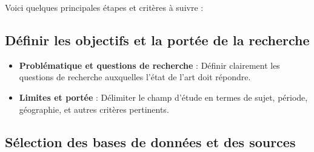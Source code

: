 \documentclass[review]{elsarticle}
\begin{document}
Voici quelques principales étapes et critères à suivre :

\subsection{Définir les objectifs et la portée de la recherche}
\begin{itemize}
    \item \textbf{Problématique et questions de recherche} : Définir clairement les questions de recherche auxquelles l'état de l'art doit répondre.
    \item \textbf{Limites et portée} : Délimiter le champ d'étude en termes de sujet, période, géographie, et autres critères pertinents.
\end{itemize}

\subsection{Sélection des bases de données et des sources}
\end{document}
